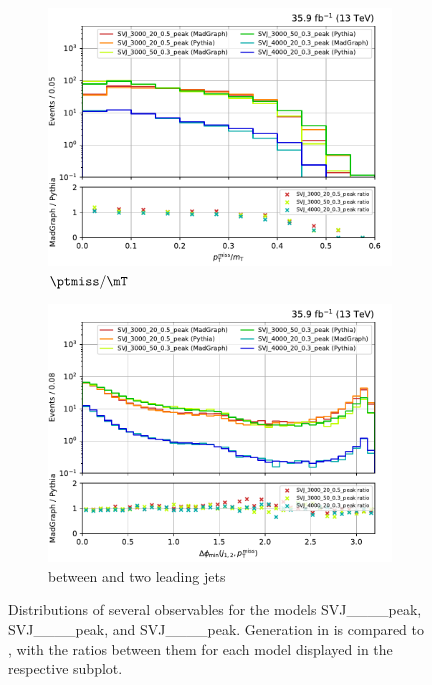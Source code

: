 \begin{figure}[htbp]
    \begin{subfigure}[b]{0.48\textwidth}
        \includegraphics[width=\textwidth]{figures/madgraph_pythia_comparisons/plots/part2/met_over_mt.pdf}
        \caption{$\ptmiss/\mT$}
    \end{subfigure}
    \hfill
    \begin{subfigure}[b]{0.48\textwidth}
        \includegraphics[width=\textwidth]{figures/madgraph_pythia_comparisons/plots/part2/min_dphi.pdf}
        \caption{\mindphi between \ptmiss and two leading \glspl{jet}}
    \end{subfigure}
    \caption[Distributions of several observables for the models SVJ\_\_\_\_\-peak, SVJ\_\_\_\_\-peak, and SVJ\_\_\_\_\-peak]{Distributions of several observables for the models SVJ\_\_\_\_\-peak, SVJ\_\_\_\_\-peak, and SVJ\_\_\_\_\-peak. Generation in \MGvATNLO is compared to \PYTHIAEIGHT, with the ratios between them for each model displayed in the respective subplot.}
    \label{fig:svj_mg_pythia_comparison_set2}
\end{figure}

